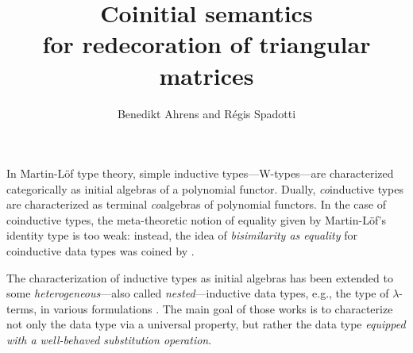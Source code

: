 \documentclass{llncs}
\begin{document}
\title{Coinitial semantics \\ for redecoration of triangular matrices}

\author{Benedikt Ahrens and R\'egis Spadotti}



%   
%   

\maketitle




 In Martin-L\"of type theory, simple inductive types---\textsf{W}-types---are characterized categorically as initial algebras of
 a polynomial functor.
 Dually, \emph{co}inductive types are characterized as terminal \emph{co}algebras of polynomial functors.
 In the case of coinductive types, the meta-theoretic notion of equality given by Martin-L\"of's identity type is too weak: instead, the idea of 
 \emph{bisimilarity as equality} for coinductive data types was coined by \textcite{aczel_nonwellfounded}.

 
 The characterization of inductive types as initial algebras 
 has been extended to some \emph{heterogeneous}---also called \emph{nested}---inductive data types, e.g., the type of $\lambda$-terms,
 in various formulations \parencite{fpt, DBLP:journals/iandc/HirschowitzM10}.
 The main goal of those works is to characterize not only the data type via a universal property, but rather the data type
 \emph{equipped with a well-behaved substitution operation}.
 
\end{document}
